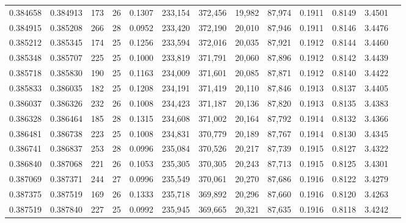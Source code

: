 \begin{tabular}{rrrrrrrrrrrrr}
0.384658 & 0.384913 &   173 &  26 &                                     0.1307 & 233,154 & 372,456 &  19,982 &  87,974 & 0.1911 & 0.8149 & 3.4501 \\
0.384915 & 0.385208 &   266 &  28 &                                     0.0952 & 233,420 & 372,190 &  20,010 &  87,946 & 0.1911 & 0.8146 & 3.4476 \\
0.385212 & 0.385345 &   174 &  25 &                                     0.1256 & 233,594 & 372,016 &  20,035 &  87,921 & 0.1912 & 0.8144 & 3.4460 \\
0.385348 & 0.385707 &   225 &  25 &                                     0.1000 & 233,819 & 371,791 &  20,060 &  87,896 & 0.1912 & 0.8142 & 3.4439 \\
0.385718 & 0.385830 &   190 &  25 &                                     0.1163 & 234,009 & 371,601 &  20,085 &  87,871 & 0.1912 & 0.8140 & 3.4422 \\
0.385833 & 0.386035 &   182 &  25 &                                     0.1208 & 234,191 & 371,419 &  20,110 &  87,846 & 0.1913 & 0.8137 & 3.4405 \\
0.386037 & 0.386326 &   232 &  26 &                                     0.1008 & 234,423 & 371,187 &  20,136 &  87,820 & 0.1913 & 0.8135 & 3.4383 \\
0.386328 & 0.386464 &   185 &  28 &                                     0.1315 & 234,608 & 371,002 &  20,164 &  87,792 & 0.1914 & 0.8132 & 3.4366 \\
0.386481 & 0.386738 &   223 &  25 &                                     0.1008 & 234,831 & 370,779 &  20,189 &  87,767 & 0.1914 & 0.8130 & 3.4345 \\
0.386741 & 0.386837 &   253 &  28 &                                     0.0996 & 235,084 & 370,526 &  20,217 &  87,739 & 0.1915 & 0.8127 & 3.4322 \\
0.386840 & 0.387068 &   221 &  26 &                                     0.1053 & 235,305 & 370,305 &  20,243 &  87,713 & 0.1915 & 0.8125 & 3.4301 \\
0.387069 & 0.387371 &   244 &  27 &                                     0.0996 & 235,549 & 370,061 &  20,270 &  87,686 & 0.1916 & 0.8122 & 3.4279 \\
0.387375 & 0.387519 &   169 &  26 &                                     0.1333 & 235,718 & 369,892 &  20,296 &  87,660 & 0.1916 & 0.8120 & 3.4263 \\
0.387519 & 0.387840 &   227 &  25 &                                     0.0992 & 235,945 & 369,665 &  20,321 &  87,635 & 0.1916 & 0.8118 & 3.4242 \\

\end{tabular}
